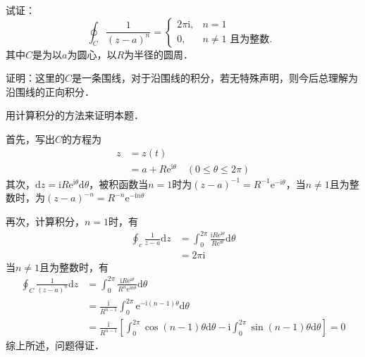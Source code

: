 \begin{example}{}
试证：
\begin{equation}
\oint_{C} \frac{1}{(z-a)^{n}}=\left\{\begin{array}{ll}2 \pi \mathrm{i}, & n=1 \\ 0, & n \neq 1 \text { 且为整数. }\end{array}\right.
\end{equation}
其中$C$是为以$a $为圆心，以$R $为半径的圆周．

证明：这里的$C $是一条围线，对于沿围线的积分，若无特殊声明，则今后总理解为沿围线的正向积分．

用计算积分的方法来证明本题．

首先，写出$C $的方程为
\begin{equation}
\begin{aligned} z &=z(t) \\ &=a+R \mathrm{e}^{\mathrm{i} \theta} \quad(0 \leqslant \theta \leqslant 2 \pi) \end{aligned}
\end{equation}
其次，$\mathrm{d} z=\mathrm{i} R \mathrm{e}^{\mathrm{i} \theta} \mathrm{d} \theta$，被积函数当$n =1$时为$(z-a)^{-1}=R^{-1} \mathrm{e}^{-\mathrm{i} \theta}$，当$n \ne 1$且为整数时，为$(z-a)^{-n}=R^{-n} \mathrm{e}^{-\mathrm{i} n \theta}$

再次，计算积分，$n=1$时，有
\begin{equation}
\begin{aligned} \oint_{c} \frac{1}{z-a} \mathrm{d} z &=\int_{0}^{2 \pi} \frac{\mathrm{i} R \mathrm{e}^{\mathrm{i} \theta}}{R \mathrm{e}^{\mathrm{i} \theta}} \mathrm{d} \theta \\ &=2 \pi \mathrm{i} \end{aligned}
\end{equation}
当$n \neq 1$且为整数时，有
\begin{equation}
\begin{aligned} \oint_{C} \frac{1}{(z-a)^{n}} \mathrm{d} z &=\int_{0}^{2 \pi} \frac{\mathrm{i} R \mathrm{e}^{\mathrm{i} \theta}}{R^{n} \mathrm{e}^{\mathrm{i} n \theta}} \mathrm{d} \theta \\ &=\frac{\mathrm{i}}{R^{n-1}} \int_{0}^{2 \pi} \mathrm{e}^{-\mathrm{i}(n-1) \theta} \mathrm{d} \theta \\ &=\frac{\mathrm{i}}{R^{n-1}}\left[\int_{0}^{2 \pi} \cos (n-1) \theta \mathrm{d} \theta-\mathrm{i} \int_{0}^{2 \pi} \sin (n-1) \theta \mathrm{d} \theta\right]=0 \end{aligned}
\end{equation}
综上所述，问题得证．
\end{example}

